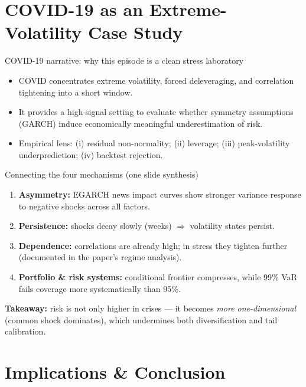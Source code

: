 \documentclass[10pt,aspectratio=169]{beamer}
\newcommand{\sm}{\small}
\begin{document}
\section{COVID-19 as an Extreme-Volatility Case Study}

\begin{frame}{COVID-19 narrative: why this episode is a clean stress laboratory}
\sm
\begin{itemize}
  \item COVID concentrates extreme volatility, forced deleveraging, and correlation tightening into a short window.
  \item It provides a high-signal setting to evaluate whether symmetry assumptions (GARCH) induce economically meaningful underestimation of risk.
  \item Empirical lens: (i) residual non-normality; (ii) leverage; (iii) peak-volatility underprediction; (iv) backtest rejection.
\end{itemize}
\end{frame}

\begin{frame}{Connecting the four mechanisms (one slide synthesis)}
\sm
\begin{enumerate}
  \item \textbf{Asymmetry:} EGARCH news impact curves show stronger variance response to negative shocks across all factors.
  \item \textbf{Persistence:} shocks decay slowly (weeks) \(\Rightarrow\) volatility states persist.
  \item \textbf{Dependence:} correlations are already high; in stress they tighten further (documented in the paper’s regime analysis).
  \item \textbf{Portfolio \& risk systems:} conditional frontier compresses, while 99\% VaR fails coverage more systematically than 95\%.
\end{enumerate}
\vspace{1mm}
\textbf{Takeaway:} risk is not only higher in crises --- it becomes \emph{more one-dimensional} (common shock dominates), which undermines both diversification and tail calibration.
\end{frame}

\section{Implications \& Conclusion}
\end{document}

